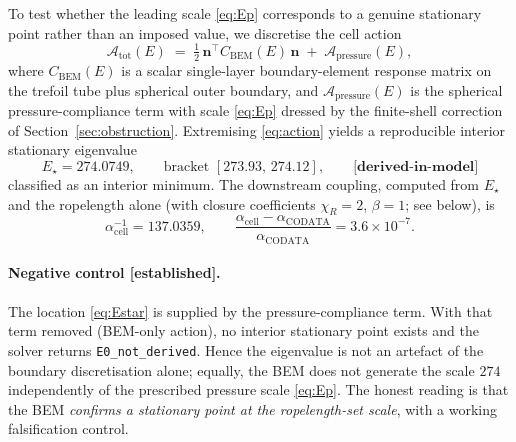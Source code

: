 \documentclass[11pt,a4paper]{article}
\theoremstyle{definition}
\newcommand{\established}{\textbf{[established]}}
\newcommand{\derivedmodel}{\textbf{[derived-in-model]}}
\begin{document}
To test whether the leading scale \eqref{eq:Ep} corresponds to a genuine
stationary point rather than an imposed value, we discretise the cell action
\begin{equation}
  \mathcal{A}_{\mathrm{tot}}(E)
  \;=\;\tfrac12\,\mathbf{n}^{\!\top} C_{\mathrm{BEM}}(E)\,\mathbf{n}
  \;+\;\mathcal{A}_{\mathrm{pressure}}(E),
  \label{eq:action}
\end{equation}
where $C_{\mathrm{BEM}}(E)$ is a scalar single-layer boundary-element response
matrix on the trefoil tube plus spherical outer boundary, and
$\mathcal{A}_{\mathrm{pressure}}(E)$ is the spherical pressure-compliance term
with scale \eqref{eq:Ep} dressed by the finite-shell correction of
Section~\ref{sec:obstruction}. Extremising \eqref{eq:action} yields a
reproducible interior stationary eigenvalue
\begin{equation}
  E_\star = 274.0749, \qquad
  \text{bracket } [273.93,\,274.12], \qquad \derivedmodel
  \label{eq:Estar}
\end{equation}
classified as an interior minimum. The downstream coupling, computed from
$E_\star$ and the ropelength alone (with closure coefficients $\chi_R=2$,
$\beta=1$; see below), is
\begin{equation}
  \alpha^{-1}_{\mathrm{cell}} = 137.0359, \qquad
  \frac{\alpha_{\mathrm{cell}}-\alpha_{\mathrm{CODATA}}}{\alpha_{\mathrm{CODATA}}}
  = 3.6\times10^{-7}.
  \label{eq:alphacell}
\end{equation}

\paragraph{Negative control \established{}.}
The location \eqref{eq:Estar} is supplied by the pressure-compliance term. With
that term removed (BEM-only action), no interior stationary point exists and the
solver returns \texttt{E0\_not\_derived}. Hence the eigenvalue is not an artefact
of the boundary discretisation alone; equally, the BEM does not generate the scale
$274$ independently of the prescribed pressure scale \eqref{eq:Ep}. The honest
reading is that the BEM \emph{confirms a stationary point at the ropelength-set
scale}, with a working falsification control.
\end{document}
